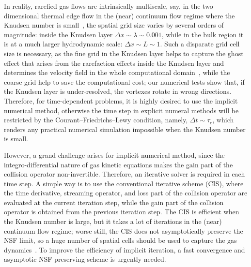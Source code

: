 \documentclass[onefignum,onetabnum]{siamart171218}
\begin{document}
In reality, rarefied gas flows are intrinsically multiscale, say, in the two-dimensional thermal edge flow in the (near) continuum flow regime where the Knudsen number is small~\cite{Su2020SIAM}, the spatial grid size varies by several orders of magnitude: inside the Knudsen layer $\Delta{x}\sim\lambda\sim0.001$, while in the bulk region it is at a much larger hydrodynamic scale: $\Delta{x}\sim{}L\sim1$. Such a disparate grid cell size is necessary, as the fine grid in the Knudsen layer helps to capture the ghost effect that arises from the rarefaction effects inside the Knudsen layer and determines the velocity field in the whole computational domain~\cite{Yoshio2000}, while the coarse grid help to save the computational cost; our numerical tests show that, if the Knudsen layer is under-resolved, the vortexes  rotate in wrong directions. Therefore, for time-dependent problems, it is highly desired to use the implicit numerical method, otherwise the time step in explicit numeral methods will be restricted by the Courant–Friedrichs–Lewy condition, namely, $\Delta{t}\sim\tau_c$, which renders any practical numerical simulation impossible when the Knudsen number is small. 


However, a grand challenge arises for implicit numerical method, since the integro-differential nature of gas kinetic equations makes the gain part of the collision operator non-invertible. Therefore, an iterative solver is required in each time step. A simple way is to use the conventional iterative scheme (CIS), where the time derivative, streaming operator, and loss part of the collision operator are evaluated at the current iteration step, while the gain part of the collision operator is obtained from the previous iteration step. The CIS is efficient when the Knudsen number is large, but it takes a lot of iterations in the (near) continuum flow regime; worse still, the CIS does not asymptotically preserve the NSF limit, so a huge number of spatial cells should be used to capture the gas dynamics~\cite{WANG201833}. To improve the efficiency of implicit iteration, a fast convergence and asymptotic NSF preserving  scheme is urgently needed.
\end{document}
